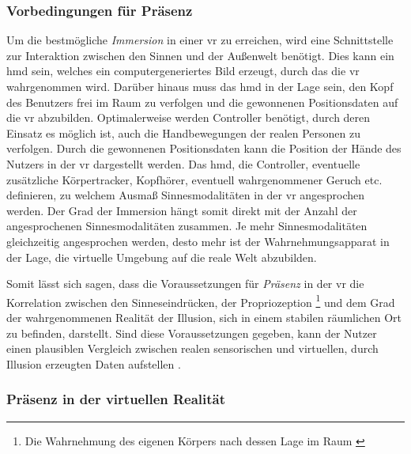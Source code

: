 \documentclass[a4paper,11pt]{article}%
\renewcommand{\\}{\vspace*{0.5\baselineskip} \newline}
\begin{document}
		\subsubsection{Vorbedingungen für Präsenz}
Um die bestmögliche \textit{Immersion} in einer \ac{vr} zu erreichen, wird eine Schnittstelle zur Interaktion zwischen den Sinnen und der Außenwelt benötigt. Dies kann ein \ac{hmd} sein, welches ein computergeneriertes Bild erzeugt, durch das die \ac{vr} wahrgenommen wird. Darüber hinaus muss das \ac{hmd} in der Lage sein, den Kopf des Benutzers frei im Raum zu verfolgen und die gewonnenen Positionsdaten auf die \ac{vr} abzubilden. Optimalerweise werden Controller benötigt, durch deren Einsatz es möglich ist, auch die Handbewegungen der realen Personen zu verfolgen. Durch die gewonnenen Positionsdaten kann die Position der Hände des Nutzers in der \ac{vr} dargestellt werden. Das \ac{hmd}, die Controller, eventuelle zusätzliche Körpertracker, Kopfhörer, eventuell wahrgenommener Geruch etc. definieren, zu welchem Ausmaß Sinnesmodalitäten in der \ac{vr} angesprochen werden. Der Grad der Immersion hängt somit direkt mit der Anzahl der angesprochenen Sinnesmodalitäten zusammen. Je mehr Sinnesmodalitäten gleichzeitig angesprochen werden, desto mehr ist der Wahrnehmungsapparat in der Lage, die virtuelle Umgebung auf die reale Welt abzubilden.

Somit lässt sich sagen, dass die Voraussetzungen für \textit{Präsenz} in der \ac{vr} die Korrelation zwischen den Sinneseindrücken, der Propriozeption \footnote{Die Wahrnehmung des eigenen Körpers nach dessen Lage im Raum \citep[S. 23]{hafelinger2013koordinationstherapie}} und dem Grad der wahrgenommenen Realität der Illusion, sich in einem stabilen räumlichen Ort zu befinden, darstellt. Sind diese Voraussetzungen gegeben, kann der Nutzer einen plausiblen Vergleich zwischen realen sensorischen und virtuellen, durch Illusion erzeugten Daten aufstellen \citep{slater2009we}.

		\subsubsection{Präsenz in der virtuellen Realität}
			
\end{document}
